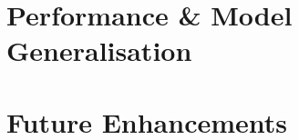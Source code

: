 \documentclass[a4paper]{article}
\begin{document}
\section{Performance \& Model Generalisation}

\section{Future Enhancements}
\end{document}
